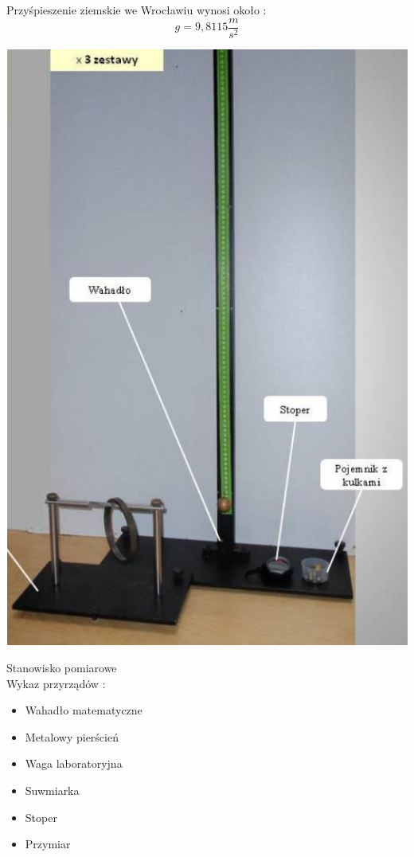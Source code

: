 \documentclass[12pt]{article}
\begin{document}
Przyśpieszenie ziemskie we Wrocławiu wynosi około :
$$ g = 9,8115 \frac{m}{s^2} $$

\includegraphics[scale=0.6]{schemat.png}

Stanowisko pomiarowe \\

Wykaz przyrządów : 
\begin{itemize}
    \item Wahadło matematyczne
    \item Metalowy pierścień
    \item Waga laboratoryjna
    \item Suwmiarka
    \item Stoper
    \item Przymiar
\end{itemize}
\end{document}

